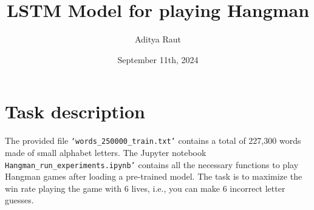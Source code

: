 \documentclass{article}
\title{\vspace{-60pt} LSTM Model for playing Hangman}
\author{\vspace{-5pt}Aditya Raut}
\date{\vspace{-5pt}September 11th, 2024}
\begin{document}
\maketitle

\vspace{-25pt}
\section{Task description}
The provided file \texttt{`words\_250000\_train.txt'} contains a total of 227,300 words made of small alphabet letters. The Jupyter notebook \texttt{Hangman\_run\_experiments.ipynb'} contains all the necessary functions to play Hangman games after loading a pre-trained model. The task is to maximize the win rate playing the game with 6 lives, i.e., you can make 6 incorrect letter guesses. 

\vspace{-5pt}
\end{document}
